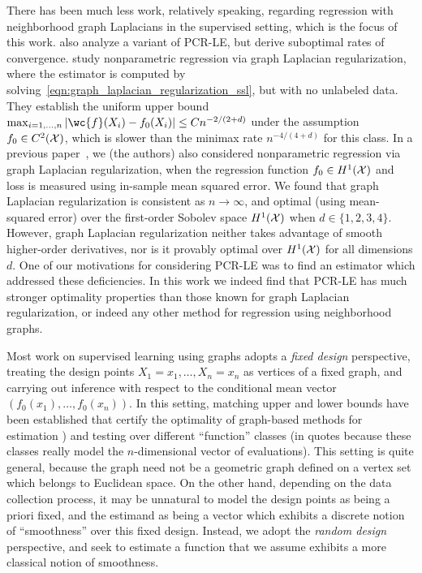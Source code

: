 There has been much less work, relatively speaking, regarding regression with neighborhood graph Laplacians in the supervised setting, which is the focus of this work. \citet{lee2016} also analyze a variant of PCR-LE, but derive suboptimal rates of convergence. \citet{trillos2020} study nonparametric regression via graph Laplacian regularization, where the estimator is computed by solving~\eqref{eqn:graph_laplacian_regularization_ssl}, but with no unlabeled data. They establish the uniform upper bound $\max_{i = 1,\ldots,n}|\wc{f}(X_i) - f_0(X_i)| \leq C n^{-2/(2 + d)}$ under the assumption $f_0 \in C^2(\mathcal{X})$, which is slower than the minimax rate $n^{-4/(4 + d)}$ for this class. In a previous paper~\citep{green2021}, we (the authors) also considered nonparametric regression via graph Laplacian regularization, when the regression function $f_0 \in H^1(\mathcal{X})$ and loss is measured using in-sample mean squared error. We found that graph Laplacian regularization is consistent as $n \to \infty$, and optimal (using mean-squared error) over the first-order Sobolev space $H^1(\mathcal{X})$ when $d \in \{1,2,3,4\}$. However, graph Laplacian regularization neither takes advantage of smooth higher-order derivatives, nor is it provably optimal over $H^1(\mathcal{X})$ for all dimensions $d$. One of our motivations for considering PCR-LE was to find an estimator which addressed these deficiencies. In this work we indeed find that PCR-LE has much stronger optimality properties than those known for graph Laplacian regularization, or indeed any other method for regression using neighborhood graphs.

Most work on supervised learning using graphs adopts a \emph{fixed design} perspective, treating the design points $X_1 = x_1,\ldots,X_n = x_n$ as vertices of a fixed graph, and carrying out inference with respect to the conditional mean vector $(f_0(x_1),\ldots,f_0(x_n))$. In this setting, matching upper and lower bounds have been established that certify the optimality of graph-based methods for estimation \citep{wang2016,hutter2016,sadhanala16,sadhanala17,kirichenko2017,kirichenko2018}) and testing \citep{sharpnack2010identifying,sharpnack2013b,sharpnack2013,sharpnack2015} over different ``function'' classes (in quotes because these classes really model the $n$-dimensional vector of evaluations). This setting is quite general, because the graph need not be a geometric graph defined on a vertex set which belongs to Euclidean space. On the other hand, depending on the data collection process, it may be unnatural to model the design points as being a priori fixed, and the estimand as being a vector which exhibits a discrete notion of ``smoothness'' over this fixed design. Instead, we adopt the \emph{random design} perspective, and seek to estimate a function that we assume exhibits a more classical notion of smoothness. 

